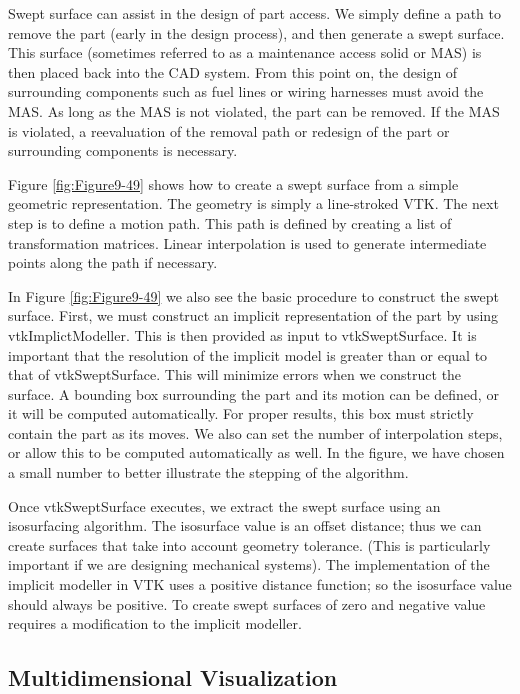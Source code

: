 Swept surface can assist in the design of part access. We simply define a path to remove the part (early in the design process), and then generate a swept surface. This surface (sometimes referred to as a maintenance access solid or MAS) is then placed back into the CAD system. From this point on, the design of surrounding components such as fuel lines or wiring harnesses must avoid the MAS. As long as the MAS is not violated, the part can be removed. If the MAS is violated, a reevaluation of the removal path or redesign of the part or surrounding components is necessary.

Figure \ref{fig:Figure9-49} shows how to create a swept surface from a simple geometric representation. The geometry is simply a line-stroked VTK. The next step is to define a motion path. This path is defined by creating a list of transformation matrices. Linear interpolation is used to generate intermediate points along the path if necessary.

In Figure \ref{fig:Figure9-49} we also see the basic procedure to construct the swept surface. First, we must construct an implicit representation of the part by using vtkImplictModeller. This is then provided as input to vtkSweptSurface. It is important that the resolution of the implicit model is greater than or equal to that of vtkSweptSurface. This will minimize errors when we construct the surface. A bounding box surrounding the part and its motion can be defined, or it will be computed automatically. For proper results, this box must strictly contain the part as its moves. We also can set the number of interpolation steps, or allow this to be computed automatically as well. In the figure, we have chosen a small number to better illustrate the stepping of the algorithm.

Once vtkSweptSurface executes, we extract the swept surface using an isosurfacing algorithm. The isosurface value is an offset distance; thus we can create surfaces that take into account geometry tolerance. (This is particularly important if we are designing mechanical systems). The implementation of the implicit modeller in VTK uses a positive distance function; so the isosurface value should always be positive. To create swept surfaces of zero and negative value requires a modification to the implicit modeller.


\subsection{Multidimensional Visualization}


